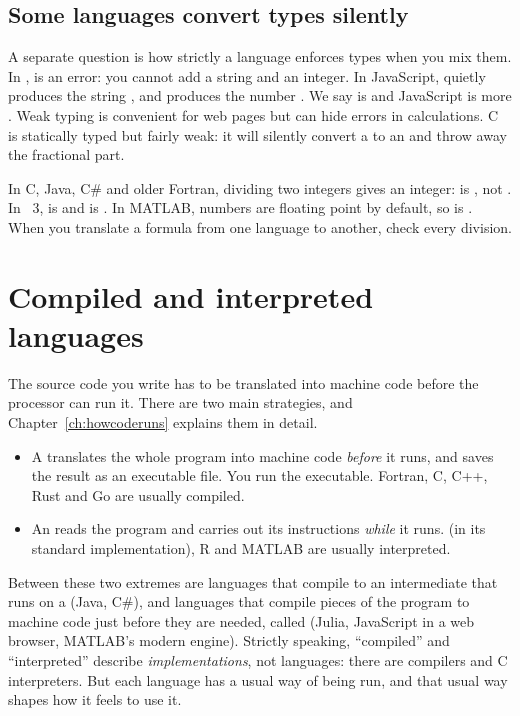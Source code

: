 \subsection*{Some languages convert types silently}

A separate question is how strictly a language enforces types when you mix them. In
\py,  is an error: you cannot add a string and an integer. In JavaScript,
 quietly produces the string , and  produces the
number . We say \py is  and JavaScript is more
. Weak typing is convenient for web pages but can hide errors in
calculations. C is statically typed but fairly weak: it will silently convert a
 to an  and throw away the fractional part.

\begin{pitfall}
In C, Java, C\# and older Fortran, dividing two integers gives an integer:
 is , not . In \py~3,  is 
and  is . In MATLAB, numbers are floating point by default, so
 is . When you translate a formula from one language to another,
check every division.
\end{pitfall}

\section{Compiled and interpreted languages}

The source code you write has to be translated into machine code before the processor can
run it. There are two main strategies, and Chapter~\ref{ch:howcoderuns} explains them
in detail.
\begin{itemize}
\item A  translates the whole program into machine code \emph{before} it
  runs, and saves the result as an executable file. You run the executable. Fortran, C,
  C++, Rust and Go are usually compiled.
\item An  reads the program and carries out its instructions
  \emph{while} it runs. \py (in its standard implementation), R and MATLAB are usually
  interpreted.
\end{itemize}
Between these two extremes are languages that compile to an intermediate
 that runs on a  (Java, C\#), and languages that
compile pieces of the program to machine code just before they are needed, called
 (Julia, JavaScript in a web browser, MATLAB's
modern engine). Strictly speaking, ``compiled'' and ``interpreted'' describe
\emph{implementations}, not languages: there are \py compilers and C interpreters. But
each language has a usual way of being run, and that usual way shapes how it feels to
use it.

